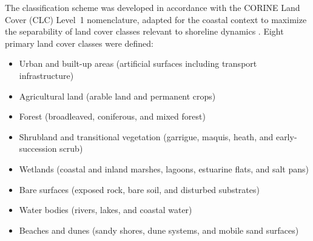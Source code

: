 \documentclass[coasts,article,submit,pdftex,moreauthors]{Definitions/mdpi}
\begin{document}
The classification scheme was developed in accordance with the CORINE Land Cover (CLC) Level~1 nomenclature, adapted for the coastal context to maximize the separability of land cover classes relevant to shoreline dynamics \citep{EEA_CLCchange}. Eight primary land cover classes were defined:
\begin{itemize}
\item Urban and built-up areas (artificial surfaces including transport infrastructure)
\item Agricultural land (arable land and permanent crops)
\item Forest (broadleaved, coniferous, and mixed forest)
\item Shrubland and transitional vegetation (garrigue, maquis, heath, and early-succession scrub)
\item Wetlands (coastal and inland marshes, lagoons, estuarine flats, and salt pans)
\item Bare surfaces (exposed rock, bare soil, and disturbed substrates)
\item Water bodies (rivers, lakes, and coastal water)
\item Beaches and dunes (sandy shores, dune systems, and mobile sand surfaces)
\end{itemize}
\end{document}

